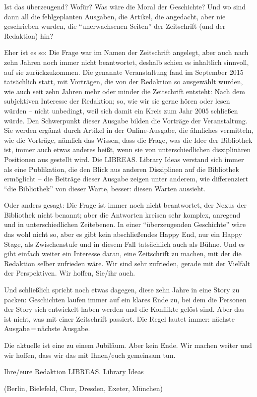 Ist das überzeugend? Wofür? Was wäre die Moral der Geschichte? Und wo
sind dann all die fehlgeplanten Ausgaben, die Artikel, die angedacht,
aber nie geschrieben wurden, die \enquote{unerwachsenen Seiten} der
Zeitschrift (und der Redaktion) hin?

Eher ist es so: Die Frage war im Namen der Zeitschrift angelegt, aber auch
nach zehn Jahren noch immer nicht beantwortet, deshalb schien es inhaltlich
sinnvoll, auf sie zurückzukommen. Die genannte Veranstaltung fand im September
2015 tatsächlich statt, mit Vorträgen, die von der Redaktion so ausgewählt
wurden, wie auch seit zehn Jahren mehr oder minder die Zeitschrift entsteht:
Nach dem subjektiven Interesse der Redaktion; so, wie wir sie gerne hören oder
lesen würden -- nicht unbedingt, weil sich damit ein Kreis zum Jahr 2005
schließen würde. Den Schwerpunkt dieser Ausgabe bilden die Vorträge der
Veranstaltung. Sie werden ergänzt durch Artikel in der Online-Ausgabe, die
ähnliches vermitteln, wie die Vorträge, nämlich das Wissen, dass die Frage,
was die Idee der Bibliothek ist, immer auch etwas anderes heißt, wenn sie von
unterschiedlichen disziplinären Positionen aus gestellt wird. Die LIBREAS.
Library Ideas verstand sich immer als eine Publikation, die den Blick aus
anderen Disziplinen auf die Bibliothek ermöglicht -- die Beiträge dieser
Ausgabe zeigen unter anderem, wie differenziert \enquote{die Bibliothek} von
dieser Warte, besser: diesen Warten aussieht.

Oder anders gesagt: Die Frage ist immer noch nicht beantwortet, der
Nexus der Bibliothek nicht benannt; aber die Antworten kreisen sehr
komplex, anregend und in unterschiedlichen Zeitebenen. In einer
\enquote{überzeugenden Geschichte} wäre das wohl nicht so, aber es gibt
kein abschließendes Happy End, nur ein Happy Stage, als Zwischenstufe
und in diesem Fall tatsächlich auch als Bühne. Und es gibt einfach
weiter ein Interesse daran, eine Zeitschrift zu machen, mit der die
Redaktion selber zufrieden wäre. Wir sind sehr zufrieden, gerade mit der
Vielfalt der Perspektiven. Wir hoffen, Sie/ihr auch.

Und schließlich spricht noch etwas dagegen, diese zehn Jahre in eine
Story zu packen: Geschichten laufen immer auf ein klares Ende zu, bei
dem die Personen der Story sich entwickelt haben werden und die
Konflikte gelöst sind. Aber das ist nicht, was mit einer Zeitschrift
passiert. Die Regel lautet immer: nächste Ausgabe\,=\,nächste Ausgabe. 

\noindent Die aktuelle ist eine zu einem Jubiläum. Aber kein Ende. Wir machen weiter
und wir hoffen, dass wir das mit Ihnen/euch gemeinsam tun.

\vspace{5mm}

\noindent Ihre/eure Redaktion LIBREAS. Library Ideas

\noindent (Berlin, Bielefeld, Chur, Dresden, Exeter, München)

